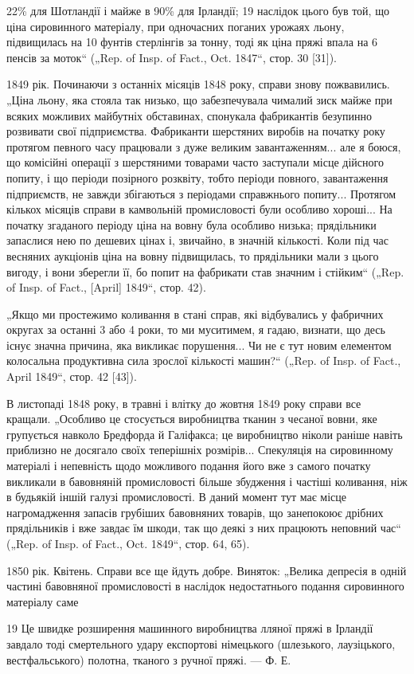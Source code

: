 22\% для Шотландії і майже в 90\% для Ірландії; 19 наслідок цього
був той, що ціна сировинного матеріалу, при одночасних поганих
урожаях льону, підвищилась на 10 фунтів стерлінгів за
тонну, тоді як ціна пряжі впала на 6 пенсів за моток“ („Rep.
of Insp. of Fact., Oct. 1847“, стор. 30 [31]).

1849 рік. Починаючи з останніх місяців 1848 року, справи
знову пожвавились. „Ціна льону, яка стояла так низько, що забезпечувала
чималий зиск майже при всяких можливих майбутніх
обставинах, спонукала фабрикантів безупинно розвивати свої
підприємства. Фабриканти шерстяних виробів на початку року
протягом певного часу працювали з дуже великим завантаженням...
але я боюся, що комісійні операції з шерстяними товарами
часто заступали місце дійсного попиту, і що періоди позірного
розквіту, тобто періоди повного, завантаження підприємств, не
завжди збігаються з періодами справжнього попиту... Протягом
кількох місяців справи в камвольній промисловості були особливо
хороші... На початку згаданого періоду ціна на вовну була особливо
низька; прядільники запаслися нею по дешевих цінах
і, звичайно, в значній кількості. Коли під час весняних аукціонів
ціна на вовну підвищилась, то прядільники мали з цього вигоду,
і вони зберегли її, бо попит на фабрикати став значним і стійким“
(„Rep. of Insp. of Fact., [April] 1849“, стор. 42).

„Якщо ми простежимо коливання в стані справ, які відбувались
у фабричних округах за останні 3 або 4 роки, то ми муситимем,
я гадаю, визнати, що десь існує значна причина, яка
викликає порушення... Чи не є тут новим елементом колосальна
продуктивна сила зрослої кількості машин?“ („Rep. of Insp.
of Fact., April 1849“, стор. 42 [43]).

В листопаді 1848 року, в травні і влітку до жовтня 1849 року
справи все кращали. „Особливо це стосується виробництва
тканин з чесаної вовни, яке групується навколо Бредфорда
й Галіфакса; це виробництво ніколи раніше навіть приблизно
не досягало своїх теперішніх розмірів... Спекуляція на сировинному
матеріалі і непевність щодо можливого подання його
вже з самого початку викликали в бавовняній промисловості
більше збудження і частіші коливання, ніж в будьякій іншій
галузі промисловості. В даний момент тут має місце нагромадження
запасів грубіших бавовняних товарів, що занепокоює
дрібних прядільників і вже завдає їм шкоди, так що деякі з
них працюють неповний час“ („Rep. of Insp. of Fact., Oct. 1849“,
стор. 64, 65).

1850 рік. Квітень. Справи все ще йдуть добре. Виняток:
„Велика депресія в одній частині бавовняної промисловості
в наслідок недостатнього подання сировинного матеріалу саме

19 Це швидке розширення машинного виробництва лляної пряжі в Ірландії
завдало тоді смертельного удару експортові німецького (шлезького, лаузіцького,
вестфальського) полотна, тканого з ручної пряжі. — Ф. Е.

